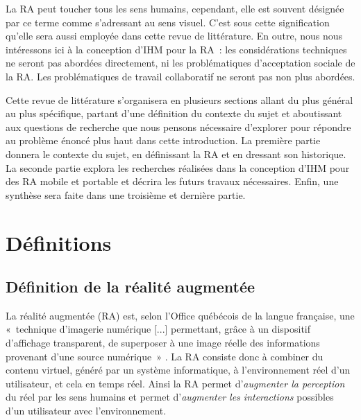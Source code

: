 
La RA peut toucher tous les sens humains, cependant, elle est souvent désignée par ce terme comme s'adressant au sens visuel. C'est sous cette signification qu'elle sera aussi employée dans cette revue de littérature. En outre, nous nous intéressons ici à la conception d'IHM pour la RA~: les considérations techniques ne seront pas abordées directement, ni les problématiques d'acceptation sociale de la RA. Les problématiques de travail collaboratif ne seront pas non plus abordées.

Cette revue de littérature s'organisera en plusieurs sections allant du plus général au plus spécifique, partant d'une définition du contexte du sujet et aboutissant aux questions de recherche que nous pensons nécessaire d'explorer pour répondre au problème énoncé plus haut dans cette introduction. La première partie donnera le contexte du sujet, en définissant la RA et en dressant son historique. La seconde partie explora les recherches réalisées dans la conception d'IHM pour des RA mobile et portable et décrira les futurs travaux nécessaires. Enfin, une synthèse sera faite dans une troisième et dernière partie.



\section*{Définitions}
\subsection*{Définition de la réalité augmentée}
La réalité augmentée (RA) est, selon l'Office québécois de la langue française, une «~technique d'imagerie numérique [...] permettant, grâce à un dispositif d'affichage transparent, de superposer à une image réelle des informations provenant d'une source numérique~» \citep{OfficeQuebecoisLangueFrancaiseRA2015}. La RA consiste donc à combiner du contenu virtuel, généré par un système informatique, à l'environnement réel d'un utilisateur, et cela en temps réel. Ainsi la RA permet d'\emph{augmenter la perception} du réel par les sens humains et permet d'\emph{augmenter les interactions} possibles d'un utilisateur avec l'environnement. \citep{Azuma1997}


